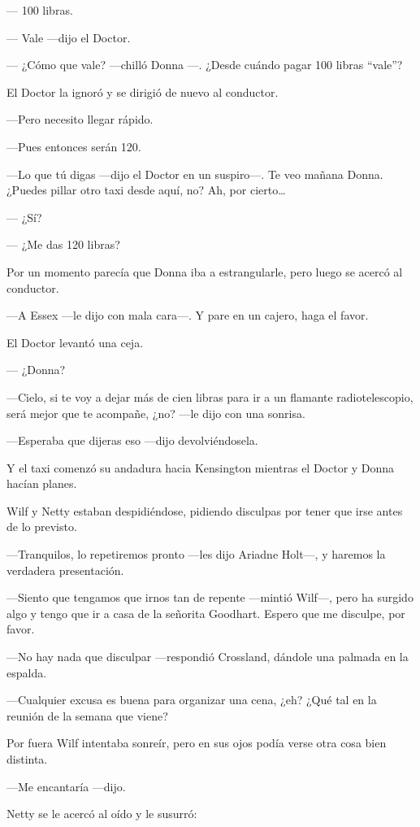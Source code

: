 ---  100 libras.

---  Vale ---dijo el Doctor.

---  ¿Cómo que vale? ---chilló Donna ---. ¿Desde cuándo pagar 100 libras
``vale''?

El Doctor la ignoró y se dirigió de nuevo al conductor.

---Pero necesito llegar rápido.

---Pues entonces serán 120.

---Lo que tú digas ---dijo el Doctor en un suspiro---.  Te veo mañana
Donna. ¿Puedes pillar otro taxi desde aquí, no? Ah, por cierto\ldots{}

--- ¿Sí?

--- ¿Me das 120 libras?

Por un momento parecía que Donna iba a estrangularle, pero luego se
acercó al conductor.

---A Essex ---le dijo con mala cara---. Y pare en un cajero, haga el
favor.

El Doctor levantó una ceja.

--- ¿Donna?

---Cielo, si te voy a dejar más de cien libras para ir a un flamante
radiotelescopio, será mejor que te acompañe, ¿no? ---le dijo con una
sonrisa.

---Esperaba que dijeras eso ---dijo devolviéndosela.

Y el taxi comenzó su andadura hacia Kensington mientras el Doctor y
Donna hacían planes.

Wilf y Netty estaban despidiéndose, pidiendo disculpas por tener que
irse antes de lo previsto.

---Tranquilos, lo repetiremos pronto ---les dijo Ariadne Holt---, y
haremos la verdadera presentación.

---Siento que tengamos que irnos tan de repente ---mintió Wilf---, pero
ha surgido algo y tengo que ir a casa de la señorita Goodhart. Espero
que me disculpe, por favor.

---No hay nada que disculpar ---respondió Crossland, dándole una palmada
en la espalda.

---Cualquier excusa es buena para organizar una cena, ¿eh? ¿Qué tal en
la reunión de la semana que viene?

Por fuera Wilf intentaba sonreír, pero en sus ojos podía verse otra cosa
bien distinta.

---Me encantaría ---dijo.

Netty se le acercó al oído y le susurró:

